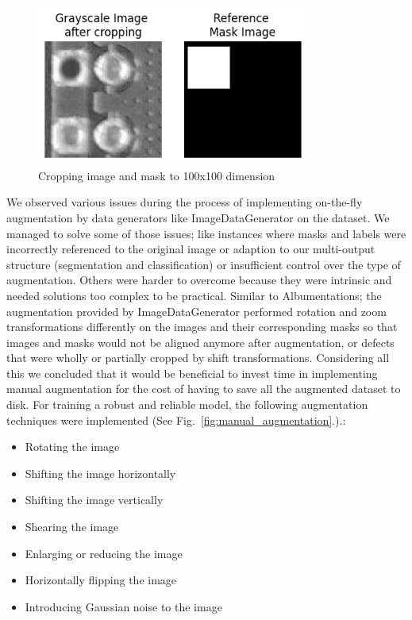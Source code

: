 \documentclass[12pt]{article}
\begin{document}
\begin{figure}[h]
    \centering
    \includegraphics[width=0.8\textwidth]{./graphics/croppedimagewithmask.png}
    \caption{Cropping image and mask to 100x100 dimension}
    \label{fig:croppedimagewithmask}
\end{figure}
\clearpage
We observed various issues during the process of implementing on-the-fly augmentation by data generators like ImageDataGenerator \cite{TensorFlowImageDataGenerator} on the dataset. We managed to solve some of those issues; like instances where masks and labels were incorrectly referenced to the original image or adaption to our multi-output structure (segmentation and classification) or insufficient control over the type of augmentation. Others were harder to overcome because they were intrinsic and needed solutions too complex to be practical. Similar to Albumentations; the  augmentation provided by ImageDataGenerator performed rotation and zoom transformations differently on the images and their corresponding masks so that images and masks would not be aligned anymore after augmentation, or defects that were wholly or partially cropped by shift transformations. Considering all this we concluded that it would be beneficial to invest time in implementing manual augmentation for the cost of having to save all the augmented dataset to disk. For training a robust and reliable model, the following augmentation techniques were implemented (See Fig.~\ref{fig:manual_augmentation}.).:

\begin{itemize}
    \item Rotating the image 
    \item Shifting the image horizontally  
    \item Shifting the image vertically  
    \item Shearing the image
    \item Enlarging or reducing  the image
    \item Horizontally flipping the image 
    \item Introducing Gaussian noise to the image
\end{itemize}
\end{document}
